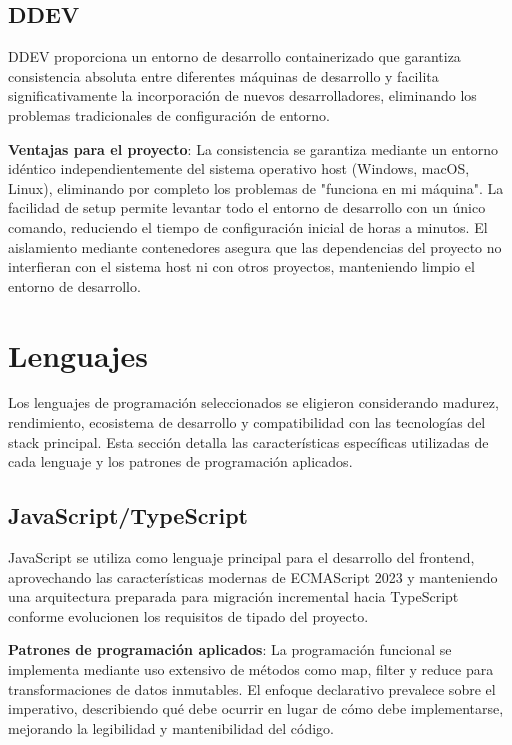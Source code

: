 \documentclass[12pt,a4paper,oneside]{report}
\begin{document}
\subsection{DDEV}\label{ddev}

DDEV proporciona un entorno de desarrollo containerizado que garantiza consistencia absoluta entre diferentes máquinas de desarrollo y facilita significativamente la incorporación de nuevos desarrolladores, eliminando los problemas tradicionales de configuración de entorno.

\textbf{Ventajas para el proyecto}: La consistencia se garantiza mediante un entorno idéntico independientemente del sistema operativo host (Windows, macOS, Linux), eliminando por completo los problemas de "funciona en mi máquina". La facilidad de setup permite levantar todo el entorno de desarrollo con un único comando, reduciendo el tiempo de configuración inicial de horas a minutos. El aislamiento mediante contenedores asegura que las dependencias del proyecto no interfieran con el sistema host ni con otros proyectos, manteniendo limpio el entorno de desarrollo.

\section{Lenguajes}\label{lenguajes}

Los lenguajes de programación seleccionados se eligieron considerando madurez, rendimiento, ecosistema de desarrollo y compatibilidad con las tecnologías del stack principal. Esta sección detalla las características específicas utilizadas de cada lenguaje y los patrones de programación aplicados.

\subsection{JavaScript/TypeScript}\label{javascripttypescript}

JavaScript se utiliza como lenguaje principal para el desarrollo del frontend, aprovechando las características modernas de ECMAScript 2023 y manteniendo una arquitectura preparada para migración incremental hacia TypeScript conforme evolucionen los requisitos de tipado del proyecto.

\textbf{Patrones de programación aplicados}: La programación funcional se implementa mediante uso extensivo de métodos como map, filter y reduce para transformaciones de datos inmutables. El enfoque declarativo prevalece sobre el imperativo, describiendo qué debe ocurrir en lugar de cómo debe implementarse, mejorando la legibilidad y mantenibilidad del código.
\end{document}
